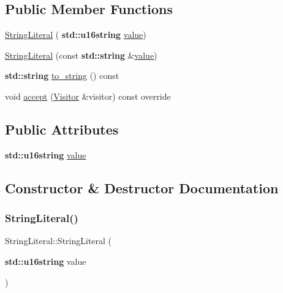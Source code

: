 \subsection*{Public Member Functions}
\begin{DoxyCompactItemize}
\item 
\hyperlink{struct_string_literal_a16fe773d6f41326c1ea714a58031e405}{String\+Literal} (\textbf{ std\+::u16string} \hyperlink{struct_string_literal_a6e41d06a20217417a1bf70171235a711}{value})
\item 
\hyperlink{struct_string_literal_a6a2c7a273d6e9db9118a97428777746f}{String\+Literal} (const \textbf{ std\+::string} \&\hyperlink{struct_string_literal_a6e41d06a20217417a1bf70171235a711}{value})
\item 
\textbf{ std\+::string} \hyperlink{struct_string_literal_a4ce38106ec30d1c68c505c4d5080e236}{to\+\_\+string} () const
\item 
void \hyperlink{struct_string_literal_a796470cf5573384c12d62520728dea26}{accept} (\hyperlink{struct_visitor}{Visitor} \&visitor) const override
\end{DoxyCompactItemize}
\subsection*{Public Attributes}
\begin{DoxyCompactItemize}
\item 
\textbf{ std\+::u16string} \hyperlink{struct_string_literal_a6e41d06a20217417a1bf70171235a711}{value}
\end{DoxyCompactItemize}


\subsection{Constructor \& Destructor Documentation}
\mbox{\label{struct_string_literal_a16fe773d6f41326c1ea714a58031e405}} 
\subsubsection{\texorpdfstring{String\+Literal()}{StringLiteral()}\hspace{0.1cm}{\footnotesize\ttfamily [1/2]}}
{\footnotesize\ttfamily String\+Literal\+::\+String\+Literal (\begin{DoxyParamCaption}\item[{\textbf{ std\+::u16string}}]{value }\end{DoxyParamCaption})\hspace{0.3cm}{\ttfamily [inline]}}

